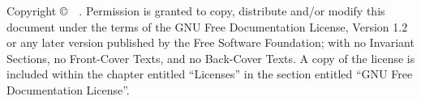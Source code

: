 \documentclass[11pt,onecolumn,letterpaper]{report}%
\begin{document}
\pagestyle{empty}

\author{\thisauthor}
\date{\docreldate}
\maketitle



\ifMKhtml
	\clearpage
\else
	\cleardoublepage
\fi
{\parindent 0in
 Copyright \copyright\ \doccpyyear\ \thisauthor.
 Permission is granted to copy, distribute and/or modify this document
 under the terms of the GNU Free Documentation License, Version 1.2
 or any later version published by the Free Software Foundation;
 with no Invariant Sections, no Front-Cover Texts, and no Back-Cover Texts.
 A copy of the license is included within the chapter
 entitled ``Licenses''
 in the section entitled ``GNU Free Documentation License''.}
\ifMKhtml
	\clearpage
\else
	\cleardoublepage
\fi

\pagestyle{plain}

\tableofcontents

\ifMKhtml
	\clearpage
\else
	\cleardoublepage
\fi
\end{document}
